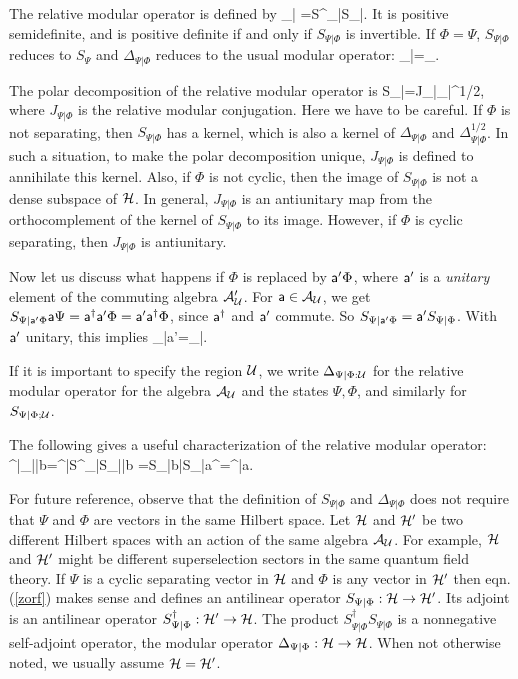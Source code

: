 \documentclass[12pt]{article}
\def\a{{\sf a}}
\def\b{{\sf b}}
\def\ra{\rangle}
\def\la{\langle}
\numberwithin{equation}{section}
\def\A{{\mathcal A}}
\begin{document}
The relative modular operator is defined by
\be\label{omorf}\Delta_{\Psi|\Phi} =S^\dagger_{\Psi|\Phi}S_{\Psi|\Phi}. \ee
It is positive semidefinite, and is positive definite  if and only if $S_{\Psi|\Phi}$ is invertible.   If $\Phi=\Psi$, $S_{\Psi|\Phi}$
reduces to $S_\Psi$ and $\Delta_{\Psi|\Phi}$ reduces to the usual modular operator:
\be\label{limorf} \Delta_{\Psi|\Psi}=\Delta_\Psi.\ee

The polar decomposition of the relative modular operator is
\be\label{nomorof} S_{\Psi|\Phi}=J_{\Psi|\Phi}\Delta_{\Psi|\Phi}^{1/2}, \ee
where $J_{\Psi|\Phi}$ is the relative modular conjugation.  Here we have to be careful.  If $\Phi$ is not separating, then $S_{\Psi|\Phi}$
has a kernel, which is also a kernel  of $\Delta_{\Psi|\Phi}$ and $\Delta_{\Psi|\Phi}^{1/2}$.  
In such a situation, to make the polar decomposition unique, $J_{\Psi|\Phi}$ is defined to annihilate this kernel.  Also, if $\Phi$ is
not cyclic, then the image of $S_{\Psi|\Phi}$ is not a dense subspace of ${\mathcal H}$.  In general, $J_{\Psi|\Phi}$ is an antiunitary map
from the orthocomplement of the kernel of $S_{\Psi|\Phi}$ to its image.  However, if $\Phi$ is cyclic separating, then $J_{\Psi|\Phi}$
is antiunitary.


Now let us discuss what happens if $\Phi$ is replaced by $\a'\Phi$, where $\a'$ is a {\it unitary} element  of the commuting
algebra $\A_\U'$.   For $\a\in\A_\U$, we  get $S_{\Psi|\a'\Phi}\a\Psi =\a^\dagger \a'\Phi=\a'\a^\dagger\Phi$, since $\a^\dagger$ and $\a'$ commute.  So
$S_{\Psi|\a'\Phi}=\a'S_{\Psi|\Phi}$.  With $\a'$ unitary, this implies
\be\label{nomorf}\Delta_{\Psi|\a'\Phi}=\Delta_{\Psi|\Phi}.\ee

If it is important to specify the region ${\mathcal U}$, we write  $\Delta_{\Psi|\Phi:{\mathcal U}}$ for the relative modular 
operator for the algebra $\A_\U$ and the states $\Psi,\Phi$, and similarly for $S_{\Psi|\Phi;{\mathcal U}}$.

The following gives a useful characterization of the relative modular operator:
\be\label{usefulone} \la\a^\dagger\Psi|\Delta_{\Psi|\Phi}|\b\Psi\ra=\la \a^\dagger\Psi|S^\dagger_{\Psi|\Phi}S_{\Psi|\Phi}|\b\Psi\ra
=\la S_{\Psi|\Phi}\b\Psi|S_{\Psi|\Phi}\a^\dagger\Psi\ra=\la\b^\dagger \Phi|\a\Phi\ra.\ee

 For future reference, observe that the definition of $S_{\Psi|\Phi}$ and $\Delta_{\Psi|\Phi}$
does not require that $\Psi$ and $\Phi$ are vectors in the same Hilbert space.  Let ${\mathcal H}$ and ${\mathcal H}'$ be two different
Hilbert spaces with an action of the same algebra $\A_\U$.  For example, ${\mathcal H}$ and ${\mathcal H}'$ might be different superselection
sectors in the same quantum field theory.  If $\Psi$ is a cyclic separating vector in ${\mathcal H}$ and $\Phi$ is any vector in ${\mathcal H}'$
then eqn. (\ref{zorf})  makes sense and defines an antilinear operator $S_{\Psi|\Phi}:{\mathcal H}\to {\mathcal H}'$.   Its adjoint is an antilinear
operator $S_{\Psi|\Phi}^\dagger:{\mathcal H}'\to {\mathcal H}$.   The product $S^\dagger_{\Psi|\Phi}S_{\Psi|\Phi}$ 
is a nonnegative self-adjoint operator, the modular
operator $\Delta_{\Psi|\Phi}:{\mathcal H}\to {\mathcal H}$.
When not otherwise noted, we usually assume ${\mathcal H}={\mathcal H}'$.
\end{document}
